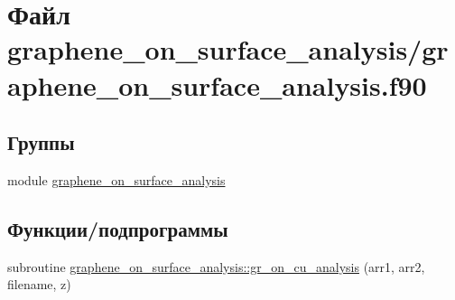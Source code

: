 \hypertarget{graphene__on__surface__analysis_8f90}{}\section{Файл graphene\+\_\+on\+\_\+surface\+\_\+analysis/graphene\+\_\+on\+\_\+surface\+\_\+analysis.f90}
\label{graphene__on__surface__analysis_8f90}
\subsection*{Группы}
\begin{DoxyCompactItemize}
\item 
module \mbox{\hyperlink{namespacegraphene__on__surface__analysis}{graphene\+\_\+on\+\_\+surface\+\_\+analysis}}
\end{DoxyCompactItemize}
\subsection*{Функции/подпрограммы}
\begin{DoxyCompactItemize}
\item 
subroutine \mbox{\hyperlink{namespacegraphene__on__surface__analysis_a02cffcc8904565bfaf36c4503f30f759}{graphene\+\_\+on\+\_\+surface\+\_\+analysis\+::gr\+\_\+on\+\_\+cu\+\_\+analysis}} (arr1, arr2, filename, z)
\end{DoxyCompactItemize}
